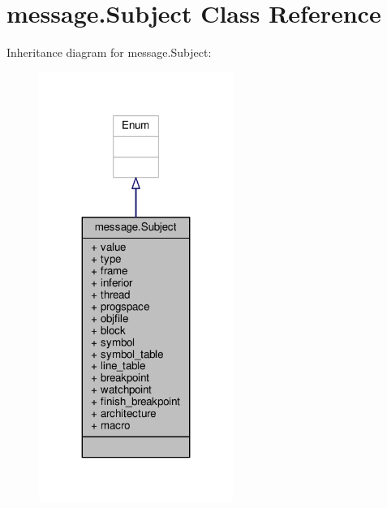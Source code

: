 \hypertarget{classmessage_1_1Subject}{}\section{message.\+Subject Class Reference}
\label{classmessage_1_1Subject}


Inheritance diagram for message.\+Subject\+:
\nopagebreak
\begin{figure}[H]
\begin{center}
\leavevmode
\includegraphics[width=179pt]{classmessage_1_1Subject__inherit__graph}
\end{center}
\end{figure}


